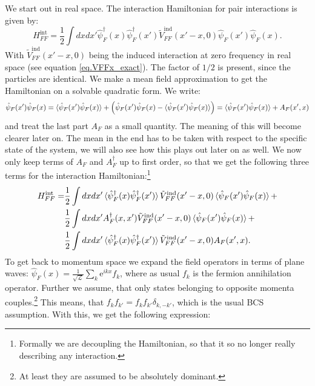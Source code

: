 We start out in real space. The interaction Hamiltonian for pair interactions is given by:
\begin{equation}
H^\text{int}_{FF} = \frac{1}{2}\int dxdx' \hat{\psi}^\dagger_F(x)\hat{\psi}^\dagger_F(x')\tilde{V}^\text{ind}_{FF}(x'-x,0) \hat{\psi}_F(x') \hat{\psi}_F(x).
\label{eq.HFFintdef}
\end{equation}
With $\tilde{V}^\text{ind}_{FF}(x'-x,0)$ being the induced interaction at zero frequency in real space (see equation \eqref{eq.VFFx_exact}). The factor of $1/2$ is present, since the particles are identical. We make a mean field approximation to get the Hamiltonian on a solvable quadratic form. We write:
\begin{equation}
\hat{\psi}_F(x') \hat{\psi}_F(x) = \braket{\hat{\psi}_F(x') \hat{\psi}_F(x)} + \left(\hat{\psi}_F(x') \hat{\psi}_F(x) - \braket{\hat{\psi}_F(x') \hat{\psi}_F(x)} \right) = \braket{\hat{\psi}_F(x') \hat{\psi}_F(x)} + A_F(x',x)
\end{equation}
and treat the last part $A_F$ as a small quantity. The meaning of this will become clearer later on. The mean in the end has to be taken with respect to the specific state of the system, we will also see how this plays out later on as well. We now only keep terms of $A_F$ and $A^\dagger_F$ up to first order, so that we get the following three terms for the interaction Hamiltonian:\footnote{Formally we are decoupling the Hamiltonian, so that it so no longer really describing any interaction.}
\begin{align}
H^\text{int}_{FF} = & \frac{1}{2}\int dxdx' \braket {\hat{\psi}^\dagger_F(x) \hat{\psi}^\dagger_F(x')}  \tilde{V}^\text{ind}_{FF}(x'-x,0) \braket{\hat{\psi}_F(x') \hat{\psi}_F(x)} + \nonumber \\
& \frac{1}{2}\int dxdx' A^\dagger_F(x,x') \tilde{V}^\text{ind}_{FF}(x'-x,0) \braket{\hat{\psi}_F(x') \hat{\psi}_F(x)} + \nonumber \\
& \frac{1}{2}\int dxdx' \braket{\hat{\psi}^\dagger_F(x) \hat{\psi}^\dagger_F(x')} \tilde{V}^\text{ind}_{FF}(x'-x,0) A_F(x',x). \nonumber
\end{align} 
To get back to momentum space we expand the field operators in terms of plane waves: $\hat{\psi}_F(x) = \frac{1}{\sqrt{\mathcal{L}}}\sum_k \text{e}^{ikx} f_k$, where as usual $f_k$ is the fermion annihilation operator. Further we assume, that only states belonging to opposite momenta couples.\footnote{At least they are assumed to be absolutely dominant.} This means, that $f_kf_{k'} = f_kf_{k'}\delta_{k,-k'}$, which is the usual BCS assumption. With this, we get the following expression:
